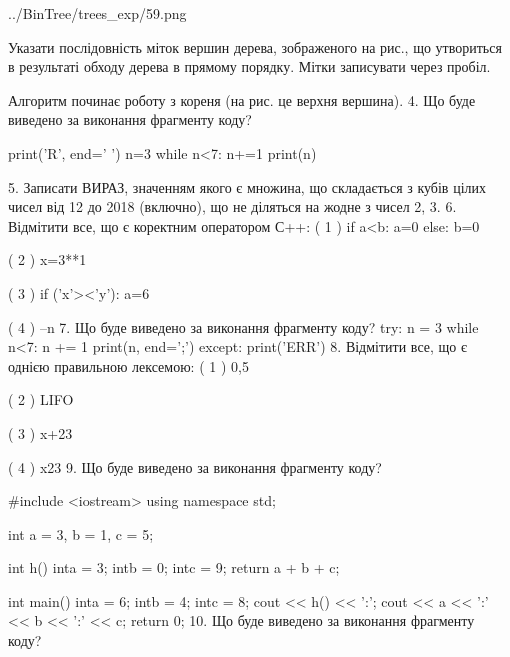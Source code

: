 \documentclass[11pt]{article}
\begin{document}
\begin{center}
	{../BinTree/trees_exp/59.png}
\end{center}
Указати послідовність міток вершин дерева, зображеного на рис., що утвориться в результаті обходу дерева в прямому порядку. Мітки записувати через пробіл.\par Алгоритм починає роботу з кореня (на рис. це верхня вершина).
\vspace{5mm}
4. Що буде виведено за виконання фрагменту коду?

print('R', end=' ')
n=3
while n<7:
    n+=1
print(n)

\vspace{5mm}
5. 
Записати ВИРАЗ, значенням якого є множина, що складається з кубів цілих чисел від 12 до 2018 (включно), що не діляться на жодне з чисел 2, 3.\vspace{5mm}
6. %
Відмітити все, що є коректним оператором С++:
( 1 ) if a<b: a=0 else: b=0

( 2 ) x=3**1

( 3 ) if ('x'><'y'): a=6

( 4 ) --n
\vspace{5mm}
7. Що буде виведено за виконання фрагменту коду?
try:
    n = 3
    while n<7:
        n += 1
    print(n, end=';')
except:
    print('ERR')
\vspace{5mm}
8. %
Відмітити все, що є однією правильною лексемою:
( 1 ) 0,5

( 2 ) LIFO

( 3 ) x+23

( 4 ) x23
\vspace{5mm}
9. Що буде виведено за виконання фрагменту коду?

#include <iostream>
using namespace std;

int a = 3, b = 1, c = 5;

int h(){
    inta = 3;
    intb = 0;
    intc = 9;
    return a + b + c;
}

int main(){
    inta = 6;
    intb = 4;
    intc = 8;
    cout << h() << ':';
    cout << a << ':' << b << ':' << c;
    return 0;
}
\vspace{5mm}
10. Що буде виведено за виконання фрагменту коду?
\end{document}
